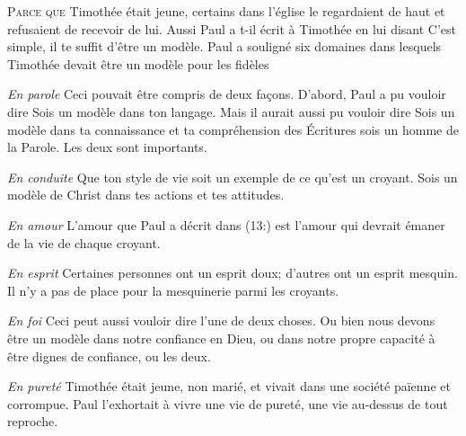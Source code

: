 \lettrine{P}{arce que} Timothée était jeune, certains dans l'église
 le regardaient de haut et refusaient de recevoir de lui.
 Aussi Paul a t-il écrit à Timothée en lui disant\frcolon {}
 \Og C'est simple, il te suffit d'être un modèle. \Fg{}
 Paul a souligné six domaines dans lesquels Timothée
 devait être un modèle pour les fidèles\frcolon


\emph{En parole} \ocadr
 Ceci pouvait être compris de deux fa\c{c}ons.
 D'abord, Paul a pu vouloir dire\frcolon {}
 \Og Sois un modèle dans ton langage. \Fg{}
 Mais il aurait aussi pu vouloir dire\frcolon {}
 \Og Sois un modèle dans ta connaissance et ta compréhension des Écritures
 \ocadr sois un homme de la Parole. \Fg{} Les deux sont importants.

\emph{En conduite} \ocadr
 Que ton style de vie soit un exemple de ce qu'est un croyant.
 Sois un modèle de Christ dans tes actions et tes attitudes.

\emph{En amour} \ocadr
 L'amour que Paul a décrit dans (13:) 
 est l'amour qui devrait émaner de la vie de chaque croyant.

\emph{En esprit} \ocadr
 Certaines personnes ont un esprit doux; d'autres ont un esprit mesquin.
 Il n'y a pas de place pour la mesquinerie parmi les croyants.

\emph{En foi} \ocadr
 Ceci peut aussi vouloir dire l'une de deux choses.
 Ou bien nous devons être un modèle dans notre confiance en Dieu,
 ou dans notre propre capacité à être dignes de confiance, ou les deux.

\emph{En pureté} \ocadr
 Timothée était jeune, non marié, et vivait dans une société païenne
 et corrompue. Paul l'exhortait à vivre une vie de pureté,
 une vie au-dessus de tout reproche.



\dvrule





